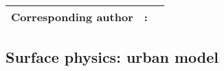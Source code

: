 {\bf \Large 
\begin{tabular}{ccc}
\hline
  Corresponding author & : & \\
\hline
\end{tabular}
}


\subsection{Surface physics: urban model}
